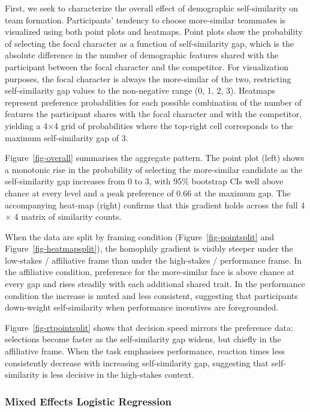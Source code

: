 \documentclass[
  man,
  floatsintext,
  longtable,
  nolmodern,
  notxfonts,
  notimes,
  draftfirst,
  colorlinks=true,linkcolor=blue,citecolor=blue,urlcolor=blue]{apa7}
\begin{document}
First, we seek to characterize the overall effect of demographic
self-similarity on team formation. Participants' tendency to choose
more-similar teammates is visualized using both point plots and
heatmaps. Point plots show the probability of selecting the focal
character as a function of self-similarity gap, which is the absolute
difference in the number of demographic features shared with the
participant between the focal character and the competitor. For
visualization purposes, the focal character is always the more-similar
of the two, restricting self-similarity gap values to the non-negative
range (0, 1, 2, 3). Heatmaps represent preference probabilities for each
possible combination of the number of features the participant shares
with the focal character and with the competitor, yielding a 4×4 grid of
probabilities where the top-right cell corresponds to the maximum
self-similarity gap of 3.

Figure~\ref{fig-overall} summarises the aggregate pattern. The point
plot (left) shows a monotonic rise in the probability of selecting the
more-similar candidate as the self-similarity gap increases from 0 to 3,
with 95\% bootstrap CIs well above chance at every level and a peak
preference of 0.66 at the maximum gap. The accompanying heat-map (right)
confirms that this gradient holds across the full 4 × 4 matrix of
similarity counts.

When the data are split by framing condition
(Figure~\ref{fig-pointsplit} and Figure~\ref{fig-heatmapsplit}), the
homophily gradient is visibly steeper under the low-stakes / affiliative
frame than under the high-stakes / performance frame. In the affiliative
condition, preference for the more-similar face is above chance at every
gap and rises steadily with each additional shared trait. In the
performance condition the increase is muted and less consistent,
suggesting that participants down-weight self-similarity when
performance incentives are foregrounded.

Figure~\ref{fig-rtpointsplit} shows that decision speed mirrors the
preference data: selections become faster as the self-similarity gap
widens, but chiefly in the affiliative frame. When the task emphasises
performance, reaction times less consistently decrease with increasing
self-similarity gap, suggesting that self-similarity is less decisive in
the high-stakes context.

\subsubsection{Mixed Effects Logistic
Regression}\label{mixed-effects-logistic-regression}
\end{document}
